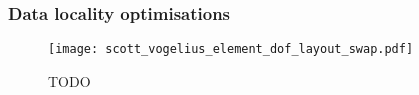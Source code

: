 \documentclass[thesis]{subfiles}
\begin{document}




\subsubsection{Data locality optimisations}
\label{sec:intro_mesh_numbering}




\begin{figure}
  \centering
  \texttt{[image: scott\_vogelius\_element\_dof\_layout\_swap.pdf]}
  \caption{
    TODO
  }
  \label{fig:scott_vogelius_element_dof_layout_swap}
\end{figure}




\end{document}
